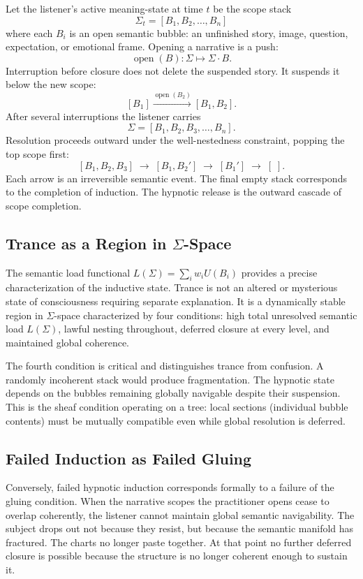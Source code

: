 \documentclass[12pt, a4paper]{article}
\theoremstyle{plain}
\theoremstyle{definition}
\theoremstyle{remark}
\DeclareMathOperator{\Open}{open}
\begin{document}
Let the listener's active meaning-state at time $t$ be the scope stack
\[
  \Sigma_t = [B_1, B_2, \ldots, B_n]
\]
where each $B_i$ is an open semantic bubble: an unfinished story, image,
question, expectation, or emotional frame. Opening a narrative is a push:
\[
  \Open(B) : \Sigma \mapsto \Sigma \cdot B.
\]
Interruption before closure does not delete the suspended story. It suspends
it below the new scope:
\[
  [B_1] \xrightarrow{\Open(B_2)} [B_1, B_2].
\]
After several interruptions the listener carries
\[
  \Sigma = [B_1, B_2, B_3, \ldots, B_n].
\]
Resolution proceeds outward under the well-nestedness constraint, popping the
top scope first:
\[
  [B_1, B_2, B_3]
  \;\longrightarrow\;
  [B_1, B_2']
  \;\longrightarrow\;
  [B_1']
  \;\longrightarrow\;
  [\;].
\]
Each arrow is an irreversible semantic event. The final empty stack
corresponds to the completion of induction. The hypnotic release is the
outward cascade of scope completion.

\subsection{Trance as a Region in $\Sigma$-Space}

The semantic load functional $L(\Sigma) = \sum_i w_i U(B_i)$ provides a
precise characterization of the inductive state. Trance is not an altered or
mysterious state of consciousness requiring separate explanation. It is a
dynamically stable region in $\Sigma$-space characterized by four conditions:
high total unresolved semantic load $L(\Sigma)$, lawful nesting throughout,
deferred closure at every level, and maintained global coherence.

The fourth condition is critical and distinguishes trance from confusion. A
randomly incoherent stack would produce fragmentation. The hypnotic state
depends on the bubbles remaining globally navigable despite their suspension.
This is the sheaf condition operating on a tree: local sections (individual
bubble contents) must be mutually compatible even while global resolution is
deferred.

\subsection{Failed Induction as Failed Gluing}

Conversely, failed hypnotic induction corresponds formally to a failure of
the gluing condition. When the narrative scopes the practitioner opens cease
to overlap coherently, the listener cannot maintain global semantic
navigability. The subject drops out not because they resist, but because the
semantic manifold has fractured. The charts no longer paste together. At that
point no further deferred closure is possible because the structure is no
longer coherent enough to sustain it.
\end{document}
